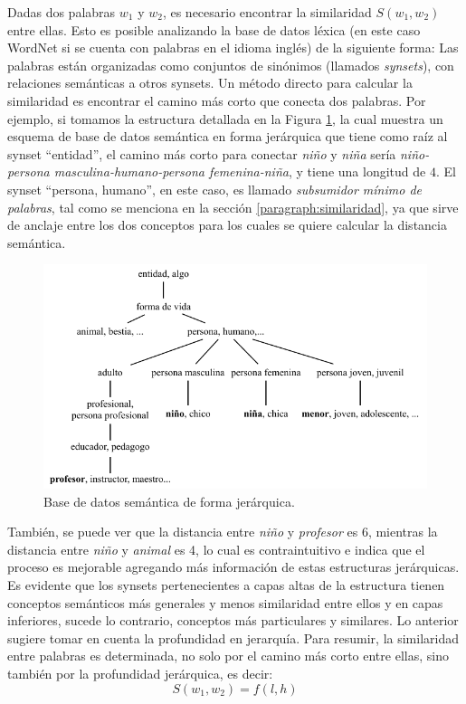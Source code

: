 \bigskip Dadas dos palabras \(w_1\) y \(w_2\), es necesario encontrar la similaridad \(S(w_1,w_2)\) entre ellas. Esto es posible analizando la base de datos léxica (en este caso WordNet si se cuenta con palabras en el idioma inglés) de la siguiente forma: Las palabras están organizadas como conjuntos de sinónimos (llamados \textit{synsets}), con relaciones semánticas a otros synsets. Un método directo para calcular la similaridad es encontrar el camino más corto que conecta dos palabras. Por ejemplo, si tomamos la estructura detallada en la Figura \ref{fig:taxonomiasemantica}, la cual muestra un esquema de base de datos semántica en forma jerárquica que tiene como raíz al synset ``entidad'', el camino más corto para conectar \textit{niño} y \textit{niña} sería \textit{niño-persona masculina-humano-persona femenina-niña}, y tiene una longitud de \(4\). El synset ``persona, humano'', en este caso, es llamado \textit{subsumidor mínimo de palabras}, tal como se menciona en la sección \ref{paragraph:similaridad}, ya que sirve de anclaje entre los dos conceptos para los cuales se quiere calcular la distancia semántica.

\begin{figure}[h!]
	\centering
	\includegraphics[width=0.9\linewidth]{7_marco_teorico/imagenes/taxonomia_semantica}
	\caption{Base de datos semántica de forma jerárquica.}
	\label{fig:taxonomiasemantica}
\end{figure}

También, se puede ver que la distancia entre \textit{niño} y \textit{profesor} es 6, mientras la distancia entre \textit{niño} y \textit{animal} es 4, lo cual es contraintuitivo e indica que el proceso es mejorable agregando más información de estas estructuras jerárquicas. Es evidente que los synsets pertenecientes a capas altas de la estructura tienen conceptos semánticos más generales y menos similaridad entre ellos y en capas inferiores, sucede lo contrario, conceptos más particulares y similares. Lo anterior sugiere tomar en cuenta la profundidad en jerarquía. Para resumir, la similaridad entre palabras es determinada, no solo por el camino más corto entre ellas, sino también por la profundidad jerárquica, es decir:
\[S(w_1,w_2)=f(l,h)\]

